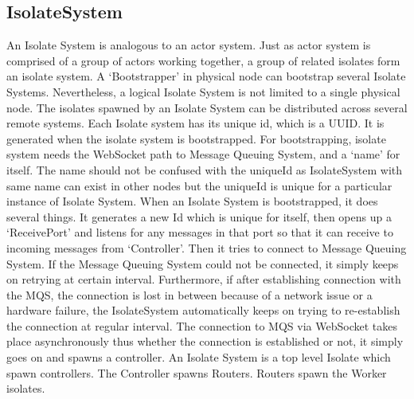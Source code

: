   \subsection{IsolateSystem}
  An Isolate System is analogous to an actor system. Just as actor system is comprised of a group of actors working together, a group of related isolates form an isolate system. A ‘Bootstrapper’ in physical node can bootstrap several Isolate Systems. Nevertheless, a logical Isolate System is not limited to a single physical node. The isolates spawned by an Isolate System can be distributed across several remote systems.
  Each Isolate system has its unique id, which is a UUID. It is generated when the isolate system is bootstrapped. For bootstrapping, isolate system needs the WebSocket path to Message Queuing System, and a ‘name’ for itself. The name should not be confused with the uniqueId as IsolateSystem with same name can exist in other nodes but the uniqueId is unique for a particular instance of Isolate System.
  When an Isolate System is bootstrapped, it does several things. It generates a new Id which is unique for itself, then opens up a ‘ReceivePort’ and listens for any messages in that port so that it can receive to incoming messages from ‘Controller’. Then it tries to connect to Message Queuing System. If the Message Queuing System could not be connected, it simply keeps on retrying at certain interval. Furthermore, if after establishing connection with the MQS, the connection is lost in between because of a network issue or a hardware failure, the IsolateSystem automatically keeps on trying to re-establish the connection at regular interval. The connection to MQS via WebSocket takes place asynchronously thus whether the connection is established or not, it simply goes on and spawns a controller.
  An Isolate System is a top level Isolate which spawn controllers. The Controller spawns Routers. Routers spawn the Worker isolates.

